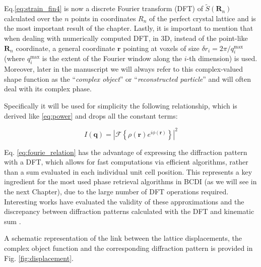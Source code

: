 
Eq.\ref{eq:strain_fin4} is now a discrete Fourier transform (DFT) of $\tilde{S}(\mathbf{R}_n)$ calculated over the $n$ 
points in coordinates $R_n$ of the perfect crystal lattice and is the most important result of the chapter. 
Lastly, it is important to mention that when dealing with numerically computed DFT, in 3D, instead of the point-like 
$\mathbf{R}_n$ coordinate, a general coordinate $\mathbf{r}$ pointing at voxels of size $\delta r_i = 2\pi/q^\text{max}_i$ 
(where $q^\text{max}_i$ is the extent of the Fourier window along the $i$-th dimension) is used. Moreover, later in the manuscript we will always refer to this complex-valued 
shape function as the ``\textit{complex object}'' or ``\textit{reconstructed particle}'' and will often deal with its 
complex phase. 

Specifically it will be used for simplicity the following relationship, which is derived like \ref{eq:power} and drops all the constant terms: 

\begin{equation}
    I(\mathbf q) =  \left| \mathcal{F}\!\left\{ \rho(\mathbf{r}) e^{i \phi(\mathbf{r})} \right\} \right |^2
    \label{eq:fourie_relation}
\end{equation}

Eq. \ref{eq:fourie_relation} has the advantage of expressing the diffraction pattern with a DFT, which allows for 
fast computations via efficient algorithms, rather than a sum evaluated in each individual unit cell position. This 
represents a key ingredient for the most used phase retrieval algorithms in BCDI (as we will see in the next Chapter), 
due to the large number of DFT operations required. Interesting works have evaluated the validity of these approximations
\cite{Godard2021} and the discrepancy between diffraction patterns calculated with the DFT and kinematic sum \cite{Haag2013, Madsen2021}.

A schematic representation of the link between the lattice displacements, the complex object function and the corresponding 
diffraction pattern is provided in Fig. \ref{fig:displacement}.

